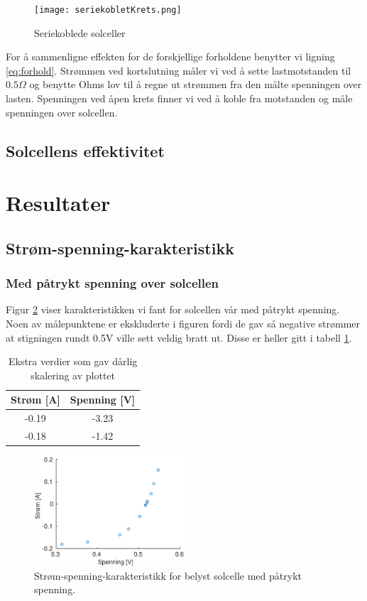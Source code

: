 \documentclass[a4paper,11pt, twocolumn]{article}
\begin{document}
\begin{figure}[!ht]
	\texttt{[image: seriekobletKrets.png]}
	\caption{Seriekoblede solceller}
	\label{fig:serie}
\end{figure}

For å sammenligne effekten for de forskjellige forholdene benytter vi ligning \eqref{eq:forhold}. Strømmen ved kortslutning måler vi ved å sette lastmotstanden til $0.5\Omega$ og benytte Ohms lov til å regne ut strømmen fra den målte spenningen over lasten. Spenningen ved åpen krets finner vi ved å koble fra motstanden og måle spenningen over solcellen.

\subsection{Solcellens effektivitet}

\section{Resultater}
\subsection{Strøm-spenning-karakteristikk}
\subsubsection{Med påtrykt spenning over solcellen}
Figur \ref{fig:resMedSpenning} viser karakteristikken vi fant for solcellen vår med påtrykt spenning. Noen av målepunktene er ekskluderte i figuren fordi de gav så negative strømmer at stigningen rundt 0.5V ville sett veldig bratt ut. Disse er heller gitt i tabell \ref{tab:ekstra}.

\begin{table}[!ht]
\centering
	\begin{tabular}{cc}
		\toprule
		\toprule
		Strøm [A] & Spenning [V]\\
		\hline
		-0.19 & -3.23\\
		-0.18 & -1.42\\
		\toprule
	\end{tabular}
	\caption{Ekstra verdier som gav dårlig skalering av plottet}
	\label{tab:ekstra}
\end{table}

\begin{figure}[!ht]
	\includegraphics[width = 0.5\textwidth]{matlab/LAB/belystMedSpenning.eps}
	\caption{Strøm-spenning-karakteristikk for belyst solcelle med påtrykt spenning.}
	\label{fig:resMedSpenning}
\end{figure}
\end{document}
